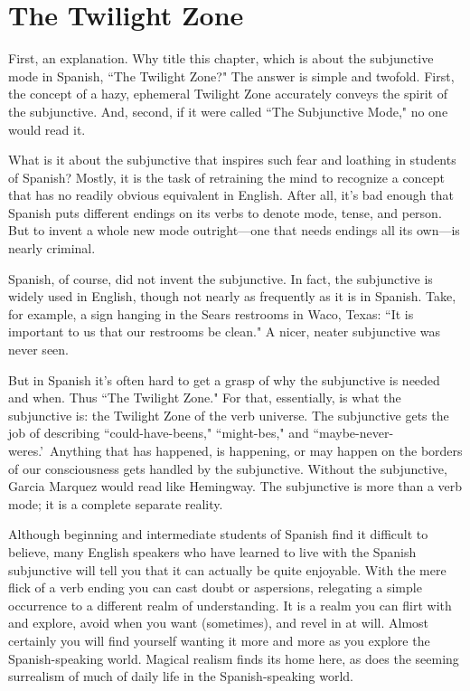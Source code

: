 \chapter{The Twilight Zone}

First, an explanation. Why title this chapter, which is about
the subjunctive mode in Spanish, ``The Twilight Zone?" The answer is
simple and twofold. First, the concept of a hazy, ephemeral Twilight
Zone accurately conveys the spirit of the subjunctive. And, second, if
it were called ``The Subjunctive Mode," no one would read it.

What is it about the subjunctive that inspires such fear and
loathing in students of Spanish? Mostly, it is the task of retraining the
mind to recognize a concept that has no readily obvious equivalent in
English. After all, it's bad enough that Spanish puts different endings
on its verbs to denote mode, tense, and person. But to invent a whole
new mode outright---one that needs endings all its own---is nearly
criminal.

Spanish, of course, did not invent the subjunctive. In fact, the
subjunctive is widely used in English, though not nearly as frequently
as it is in Spanish. Take, for example, a sign hanging in the Sears restrooms in Waco, Texas: ``It is important to us that our restrooms be
clean." A nicer, neater subjunctive was never seen.

But in Spanish it's often hard to get a grasp of why the subjunctive is needed and when. Thus ``The Twilight Zone." For that, essentially, is what the subjunctive is: the Twilight Zone of the verb universe. The subjunctive gets the job of describing ``could-have-beens,"
``might-bes," and ``maybe-never-weres.'~Anything that has happened,
is happening, or may happen on the borders of our consciousness gets
handled by the subjunctive. Without the subjunctive, Garcia Marquez
would read like Hemingway. The subjunctive is more than a verb
mode; it is a complete separate reality.

Although beginning and intermediate students of Spanish find
it difficult to believe, many English speakers who have learned to live
with the Spanish subjunctive will tell you that it can actually be quite
enjoyable. With the mere flick of a verb ending you can cast doubt or
aspersions, relegating a simple occurrence to a different realm of understanding. It is a realm you can flirt with and explore, avoid when
you want (sometimes), and revel in at will. Almost certainly you will
find yourself wanting it more and more as you explore the Spanish-speaking world. Magical realism finds its home here, as does the seeming surrealism of much of daily life in the Spanish-speaking world.


